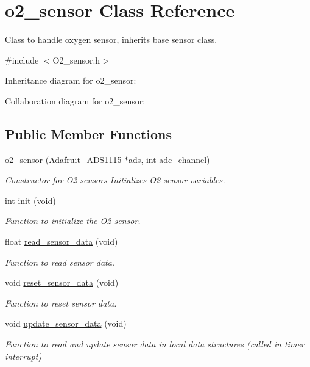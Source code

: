 \hypertarget{classo2__sensor}{}\section{o2\+\_\+sensor Class Reference}
\label{classo2__sensor}


Class to handle oxygen sensor, inherits base sensor class.  




{\ttfamily \#include $<$O2\+\_\+sensor.\+h$>$}



Inheritance diagram for o2\+\_\+sensor\+:


Collaboration diagram for o2\+\_\+sensor\+:
\subsection*{Public Member Functions}
\begin{DoxyCompactItemize}
\item 
\mbox{\label{classo2__sensor_add286a0177fdb82ffae18ae4b251eefb}} 
\hyperlink{classo2__sensor_add286a0177fdb82ffae18ae4b251eefb}{o2\+\_\+sensor} (\hyperlink{class_adafruit___a_d_s1115}{Adafruit\+\_\+\+A\+D\+S1115} $\ast$ads, int adc\+\_\+channel)
\begin{DoxyCompactList}\small\item\em Constructor for O2 sensors Initializes O2 sensor variables. \end{DoxyCompactList}\item 
int \hyperlink{group___ventilator_module_ga913dbc20ebbe78e12f33075d8b0b4b1a}{init} (void)
\begin{DoxyCompactList}\small\item\em Function to initialize the O2 sensor. \end{DoxyCompactList}\item 
float \hyperlink{group___ventilator_module_ga9601927ed36f205bdc9a8dfb55cf9657}{read\+\_\+sensor\+\_\+data} (void)
\begin{DoxyCompactList}\small\item\em Function to read sensor data. \end{DoxyCompactList}\item 
void \hyperlink{group___ventilator_module_gacc2551ecc6e2b9542a747aed535eda43}{reset\+\_\+sensor\+\_\+data} (void)
\begin{DoxyCompactList}\small\item\em Function to reset sensor data. \end{DoxyCompactList}\item 
void \hyperlink{group___ventilator_module_ga460fc40d059c217fa41e4539cdb3c11d}{update\+\_\+sensor\+\_\+data} (void)
\begin{DoxyCompactList}\small\item\em Function to read and update sensor data in local data structures (called in timer interrupt) \end{DoxyCompactList}\end{DoxyCompactItemize}
